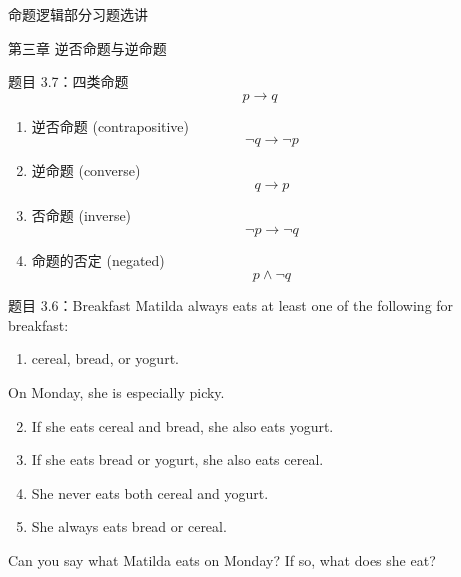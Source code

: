 \begin{frame}{}
  \centerline{\LARGE 命题逻辑部分习题选讲}
  \vspace{0.50cm}
  \centerline{\large 第三章 \; 逆否命题与逆命题}
\end{frame}

\begin{frame}{}
  \begin{exampleblock}{题目 3.7：四类命题}
    \[
      p \to q
    \]
    \begin{enumerate}
      \item 逆否命题 (contrapositive)
	\[
	  \lnot q \to \lnot p
	\]
      \item 逆命题 (converse)
	\[
	  q \to p
	\]
      \item 否命题 (inverse)
	\[
	  \lnot p \to \lnot q
	\]
      \item 命题的否定 (negated)
	\[
	  p \land \lnot q
	\]
    \end{enumerate}
  \end{exampleblock}
\end{frame}

\begin{frame}{}
  \begin{exampleblock}{题目 3.6：Breakfast}
    Matilda always eats at least one of the following for breakfast: \\
    \begin{enumerate}
      \item cereal, bread, or yogurt. 
    \end{enumerate}
    On Monday, she is especially picky.

    \begin{enumerate}
      \setcounter{enumi}{1}
      \item If she eats cereal and bread, she also eats yogurt.
      \item If she eats bread or yogurt, she also eats cereal.
      \item She never eats both cereal and yogurt.
      \item She always eats bread or cereal.
    \end{enumerate}

    Can you say what Matilda eats on Monday? If so, what does she eat?
  \end{exampleblock}
\end{frame}

